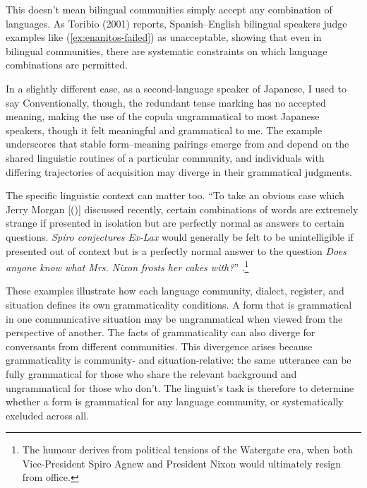 \documentclass[12pt,letterpaper]{article}
\begin{document}
This doesn't mean bilingual communities simply accept any combination of languages. As Toribio (2001) reports, Spanish--English bilingual speakers judge examples like (\ref{ex:enanitos-failed}) as unacceptable, showing that even in bilingual communities, there are systematic constraints on which language combinations are permitted.

\label{ex:enanitos-failed}
\z

In a slightly different case, as a second-language speaker of Japanese, I used to say
\z
Conventionally, though, the redundant tense marking has no accepted meaning, making the use of the copula ungrammatical to most Japanese speakers, though it felt meaningful and grammatical to me. The example underscores that stable form--meaning pairings emerge from and depend on the shared linguistic routines of a particular community, and individuals with differing trajectories of acquisition may diverge in their grammatical judgments.

The specific linguistic context can matter too. ``To take an obvious case which Jerry Morgan [(\citeyear{morgan1973})] discussed recently, certain combinations of words are extremely strange if presented in isolation but are perfectly normal as answers to certain questions. \textit{Spiro conjectures Ex-Lax} would generally be felt to be unintelligible if presented out of context but is a perfectly normal answer to the question \textit{Does anyone know what Mrs. Nixon frosts her cakes with?}'' \autocite[252, italics added]{McCawley1974}.\footnote{The humour derives from political tensions of the Watergate era, when both Vice-President Spiro Agnew and President Nixon would ultimately resign from office.}

These examples illustrate how each language community, dialect, register, and situation defines its own grammaticality conditions. A form that is grammatical in one communicative situation may be ungrammatical when viewed from the perspective of another. The facts of grammaticality can also diverge for conversants from different communities. This divergence arises because grammaticality is community- and situation-relative: the same utterance can be fully grammatical for those who share the relevant background and ungrammatical for those who don't. The linguist's task is therefore to determine whether a form is grammatical for any language community, or systematically excluded across all.
\end{document}
